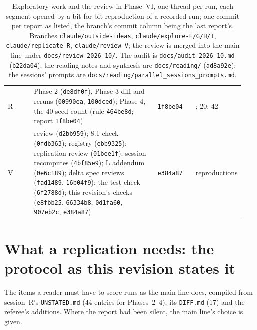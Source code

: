 \documentclass[11pt]{article}
\begin{document}
\begin{table}[H]
\begin{tabular}{@{}>{\raggedright\arraybackslash}p{0.11\linewidth}>{\raggedright\arraybackslash}p{0.52\linewidth}>{\raggedright\arraybackslash}p{0.16\linewidth}>{\raggedright\arraybackslash}p{0.15\linewidth}@{}}
R & Phase 2 (\texttt{de8df0f}), Phase 3 diff and reruns (\texttt{00990ea}, \texttt{100dced}); Phase 4, the 40-seed count (rule \texttt{464be8d}; report \texttt{1f8be04}) & \texttt{1f8be04} & 42; 20; 42\\
V & review (\texttt{d2bb959}); 8.1 check (\texttt{0fdb363}); registry (\texttt{ebb9325}); replication review (\texttt{01bee1f}); session recomputes (\texttt{4bf85e9}); L addendum (\texttt{0e6c189}); delta spec reviews (\texttt{fad1489}, \texttt{16b04f9}); the test check (\texttt{6f2788d}); this revision's checks (\texttt{e8fbb25}, \texttt{66334b8}, \texttt{0d1fa60}, \texttt{907eb2c}, \texttt{e384a87}) & \texttt{e384a87} & 2 reproductions\\
\bottomrule
\end{tabular}
\caption{Exploratory work and the review in Phase~VI, one thread per run, each segment opened by a bit-for-bit reproduction of a recorded run; one commit per report as listed, the branch's commit column being the last report's. Branches \texttt{claude/outside-ideas}, \texttt{claude/explore-F/G/H/I}, \texttt{claude/replicate-R}, \texttt{claude/review-V}; the review is merged into the main line under \texttt{docs/review\_2026-10/}. The audit is \texttt{docs/audit\_2026-10.md} (\texttt{b22da04}); the reading notes and synthesis are \texttt{docs/reading/} (\texttt{ad8a92e}); the sessions' prompts are \texttt{docs/reading/parallel\_sessions\_prompts.md}.}
\label{tab:batches}
\end{table}

\section{What a replication needs: the protocol as this revision states it}
\label{app:repro}

The items a reader must have to score runs as the main line does, compiled from session~R's \texttt{UNSTATED.md} (44 entries for Phases~2--4), its \texttt{DIFF.md} (17) and the referee's additions. Where the report had been silent, the main line's choice is given.
\end{document}

